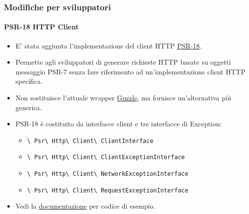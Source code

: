 
\begin{frame}[fragile]
	\frametitle{Modifiche per sviluppatori}
	\framesubtitle{PSR-18 HTTP Client}

	\begin{itemize}
		\item E' stata aggiunta l'implementazione del client HTTP \href{https://www.php-fig.org/psr/psr-18/}{PSR-18}.
		\item Permette agli sviluppatori di generare richieste HTTP basate su oggetti messaggio PSR-7
			senza fare riferimento ad un'implementazione client HTTP specifica.
		\item Non sostituisce l'attuale wrapper \href{http://guzzlephp.org/}{Guzzle},
		    ma fornisce un'alternativa più generica.
		\item PSR-18 è costituito da interfacce client e tre interfacce di Exception:

			\begin{itemize}\smaller
				\item \texttt{\textbackslash
					Psr\textbackslash
					Http\textbackslash
					Client\textbackslash
					ClientInterface}
				\item \texttt{\textbackslash
					Psr\textbackslash
					Http\textbackslash
					Client\textbackslash
					ClientExceptionInterface}
				\item \texttt{\textbackslash
					Psr\textbackslash
					Http\textbackslash
					Client\textbackslash
					NetworkExceptionInterface}
				\item \texttt{\textbackslash
					Psr\textbackslash
					Http\textbackslash
					Client\textbackslash
					RequestExceptionInterface}
			\end{itemize}\normalsize

		\item Vedi la
			\href{https://docs.typo3.org/c/typo3/cms-core/master/en-us/Changelog/10.1/Feature-89216-PSR-18HTTPClientImplementation.html}{documentazione}
			per codice di esempio.

	\end{itemize}

\end{frame}


